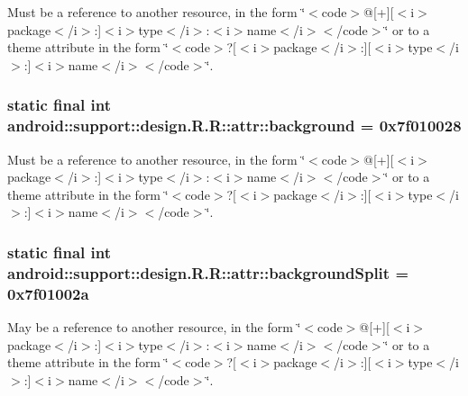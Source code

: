 Must be a reference to another resource, in the form \char`\"{}$<$code$>$@\mbox{[}+\mbox{]}\mbox{[}$<$i$>$package$<$/i$>$:\mbox{]}$<$i$>$type$<$/i$>$:$<$i$>$name$<$/i$>$$<$/code$>$\char`\"{} or to a theme attribute in the form \char`\"{}$<$code$>$?\mbox{[}$<$i$>$package$<$/i$>$:\mbox{]}\mbox{[}$<$i$>$type$<$/i$>$:\mbox{]}$<$i$>$name$<$/i$>$$<$/code$>$\char`\"{}. \hypertarget{classandroid_1_1support_1_1design_1_1_r_1_1attr_cc6743b766d65b00409c7b3f01ba8f4b}{
\subsubsection[{background}]{\setlength{\rightskip}{0pt plus 5cm}static final int android::support::design.R.R::attr::background = 0x7f010028}}
\label{classandroid_1_1support_1_1design_1_1_r_1_1attr_cc6743b766d65b00409c7b3f01ba8f4b}


Must be a reference to another resource, in the form \char`\"{}$<$code$>$@\mbox{[}+\mbox{]}\mbox{[}$<$i$>$package$<$/i$>$:\mbox{]}$<$i$>$type$<$/i$>$:$<$i$>$name$<$/i$>$$<$/code$>$\char`\"{} or to a theme attribute in the form \char`\"{}$<$code$>$?\mbox{[}$<$i$>$package$<$/i$>$:\mbox{]}\mbox{[}$<$i$>$type$<$/i$>$:\mbox{]}$<$i$>$name$<$/i$>$$<$/code$>$\char`\"{}. \hypertarget{classandroid_1_1support_1_1design_1_1_r_1_1attr_e660a737a943ad912fadde1147c1985e}{
\subsubsection[{backgroundSplit}]{\setlength{\rightskip}{0pt plus 5cm}static final int android::support::design.R.R::attr::backgroundSplit = 0x7f01002a}}
\label{classandroid_1_1support_1_1design_1_1_r_1_1attr_e660a737a943ad912fadde1147c1985e}


May be a reference to another resource, in the form \char`\"{}$<$code$>$@\mbox{[}+\mbox{]}\mbox{[}$<$i$>$package$<$/i$>$:\mbox{]}$<$i$>$type$<$/i$>$:$<$i$>$name$<$/i$>$$<$/code$>$\char`\"{} or to a theme attribute in the form \char`\"{}$<$code$>$?\mbox{[}$<$i$>$package$<$/i$>$:\mbox{]}\mbox{[}$<$i$>$type$<$/i$>$:\mbox{]}$<$i$>$name$<$/i$>$$<$/code$>$\char`\"{}. 

